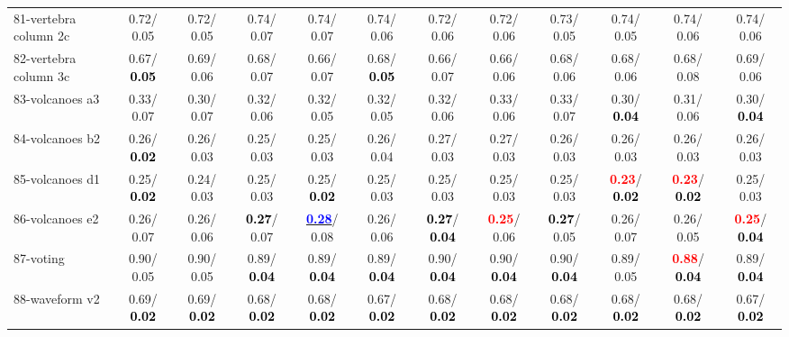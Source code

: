 \begin{table}[h]
\begin{center}
{\begin{tabular}{lc|c|c|c|c|c|c|c|c|c|c}
81-vertebra column 2c &   0.72/  0.05 &   0.72/  0.05 &   0.74/  0.07 &   0.74/  0.07 &   0.74/  0.06 &   0.72/  0.06 &   0.72/  0.06 &   0.73/  0.05 &   0.74/  0.05 &   0.74/  0.06 &   0.74/  0.06 \\
82-vertebra column 3c &   0.67/\textcolor{black}{\textbf{  0.05}} &   0.69/  0.06 &   0.68/  0.07 &   0.66/  0.07 &   0.68/\textcolor{black}{\textbf{  0.05}} &   0.66/  0.07 &   0.66/  0.06 &   0.68/  0.06 &   0.68/  0.06 &   0.68/  0.08 &   0.69/  0.06 \\
83-volcanoes a3 &   0.33/  0.07 &   0.30/  0.07 &   0.32/  0.06 &   0.32/  0.05 &   0.32/  0.05 &   0.32/  0.06 &   0.33/  0.06 &   0.33/  0.07 &   0.30/\textcolor{black}{\textbf{  0.04}} &   0.31/  0.06 &   0.30/\textcolor{black}{\textbf{  0.04}} \\
84-volcanoes b2 &   0.26/\textcolor{black}{\textbf{  0.02}} &   0.26/  0.03 &   0.25/  0.03 &   0.25/  0.03 &   0.26/  0.04 &   0.27/  0.03 &   0.27/  0.03 &   0.26/  0.03 &   0.26/  0.03 &   0.26/  0.03 &   0.26/  0.03 \\
85-volcanoes d1 &   0.25/\textcolor{black}{\textbf{  0.02}} &   0.24/  0.03 &   0.25/  0.03 &   0.25/\textcolor{black}{\textbf{  0.02}} &   0.25/  0.03 &   0.25/  0.03 &   0.25/  0.03 &   0.25/  0.03 & \textcolor{red}{\textbf{  0.23}}/\textcolor{black}{\textbf{  0.02}} & \textcolor{red}{\textbf{  0.23}}/\textcolor{black}{\textbf{  0.02}} &   0.25/  0.03 \\ \hline
86-volcanoes e2 &   0.26/  0.07 &   0.26/  0.06 & \textcolor{black}{\textbf{  0.27}}/  0.07 & \underline{\textcolor{blue}{\textbf{  0.28}}}/  0.08 &   0.26/  0.06 & \textcolor{black}{\textbf{  0.27}}/\textcolor{black}{\textbf{  0.04}} & \textcolor{red}{\textbf{  0.25}}/  0.06 & \textcolor{black}{\textbf{  0.27}}/  0.05 &   0.26/  0.07 &   0.26/  0.05 & \textcolor{red}{\textbf{  0.25}}/\textcolor{black}{\textbf{  0.04}} \\
87-voting &   0.90/  0.05 &   0.90/  0.05 &   0.89/\textcolor{black}{\textbf{  0.04}} &   0.89/\textcolor{black}{\textbf{  0.04}} &   0.89/\textcolor{black}{\textbf{  0.04}} &   0.90/\textcolor{black}{\textbf{  0.04}} &   0.90/\textcolor{black}{\textbf{  0.04}} &   0.90/\textcolor{black}{\textbf{  0.04}} &   0.89/  0.05 & \textcolor{red}{\textbf{  0.88}}/\textcolor{black}{\textbf{  0.04}} &   0.89/\textcolor{black}{\textbf{  0.04}} \\
88-waveform v2 &   0.69/\textcolor{black}{\textbf{  0.02}} &   0.69/\textcolor{black}{\textbf{  0.02}} &   0.68/\textcolor{black}{\textbf{  0.02}} &   0.68/\textcolor{black}{\textbf{  0.02}} &   0.67/\textcolor{black}{\textbf{  0.02}} &   0.68/\textcolor{black}{\textbf{  0.02}} &   0.68/\textcolor{black}{\textbf{  0.02}} &   0.68/\textcolor{black}{\textbf{  0.02}} &   0.68/\textcolor{black}{\textbf{  0.02}} &   0.68/\textcolor{black}{\textbf{  0.02}} &   0.67/\textcolor{black}{\textbf{  0.02}} \\

\end{tabular}}
\end{center}
\end{table}

